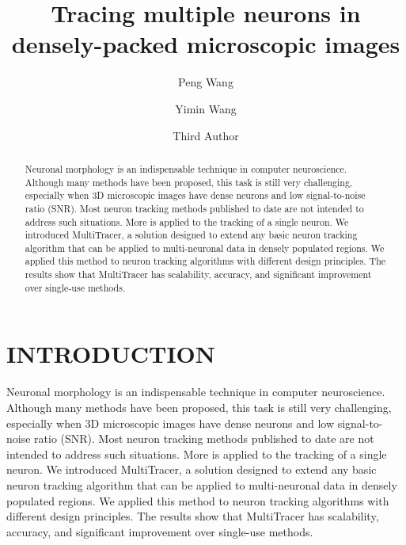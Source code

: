 \documentclass[runningheads]{llncs}
\begin{document}
%
\title{Tracing multiple neurons in  densely-packed microscopic images}
%
%

\author{Peng Wang \and
Yimin Wang\and
Third Author}

%
%
%
\maketitle              %
%
\begin{abstract}

Neuronal morphology is an indispensable technique in computer neuroscience. Although many methods have been proposed, this task is still very challenging, especially when 3D microscopic images have dense neurons and low signal-to-noise ratio (SNR).
Most neuron tracking methods published to date are not intended to address such situations. More is applied to the tracking of a single neuron. We introduced MultiTracer, a solution designed to extend any basic neuron tracking algorithm that can be applied to multi-neuronal data in densely populated regions. We applied this method to neuron tracking algorithms with different design principles. The results show that MultiTracer has scalability, accuracy, and significant improvement over single-use methods.
\end{abstract}
%
%
%
\section{INTRODUCTION}
Neuronal morphology is an indispensable technique in computer neuroscience. Although many methods have been proposed, this task is still very challenging, especially when 3D microscopic images have dense neurons and low signal-to-noise ratio (SNR).
Most neuron tracking methods published to date are not intended to address such situations. More is applied to the tracking of a single neuron. We introduced MultiTracer, a solution designed to extend any basic neuron tracking algorithm that can be applied to multi-neuronal data in densely populated regions. We applied this method to neuron tracking algorithms with different design principles. The results show that MultiTracer has scalability, accuracy, and significant improvement over single-use methods.
\end{document}
